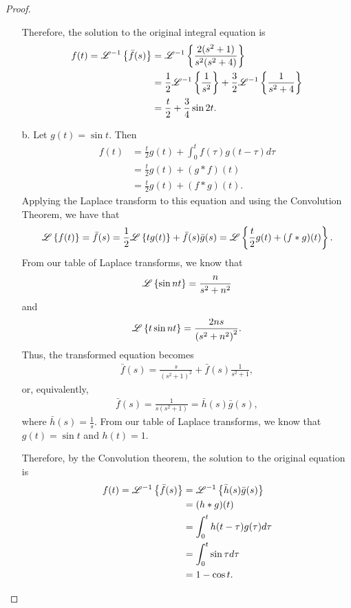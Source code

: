 \begin{proof}
\begin{enumerate}
      Therefore, the solution to the original integral equation is
      \begin{align*}
        f(t) = \mathscr{L}^{-1}\left\{ {\bar{f}(s)} \right\}
        &= \mathscr{L}^{-1}\left\{ {\frac{2(s^2 + 1)}{s^2(s^2+4)}} \right\}\\
        &= \frac{1}{2}\mathscr{L}^{-1}\left\{ {\frac{1}{s^2}} \right\} + \frac{3}{2}\mathscr{L}^{-1}\left\{ {\frac{1}{s^2+4}} \right\}\\
        &= \frac{t}{2} + \frac{3}{4} \sin 2t.
      \end{align*}

    \item[b.] Let $g(t) = \sin t$. Then
      \begin{align*}
        f(t) &= \frac{t}{2}g(t) + \int_0^t f(\tau)g(t-\tau) d\tau \\
        &= \frac{t}{2}g(t) + (g \ast f)(t) \\
        &= \frac{t}{2}g(t) + (f \ast g)(t).
      \end{align*}
      Applying the Laplace transform to this equation and using the Convolution Theorem, we have that
      \begin{align*}
        \mathscr{L}\left\{ {f(t)} \right\} = \bar{f}(s) = \frac{1}{2}\mathscr{L}\left\{ {t g(t)} \right\} + \bar{f}(s)\bar{g}(s) = \mathscr{L}\left\{ {\frac{t}{2}g(t) + (f \ast g)(t)} \right\}.
      \end{align*}
      From our table of Laplace transforms, we know that
      \begin{align*}
        \mathscr{L}\left\{ {\sin n t} \right\} = \frac{n}{s^2 + n^2}
      \end{align*}
      and
      \begin{align*}
        \mathscr{L}\left\{ {t \sin n t} \right\} = \frac{2ns}{\left(s^2 + n^2\right)^2}.
      \end{align*}
      Thus, the transformed equation becomes
      \begin{align*}
        \bar{f}(s) = \frac{s}{\left(s^2 + 1\right)^2} + \bar{f}(s)\frac{1}{s^2 + 1},
      \end{align*}
      or, equivalently,
      \begin{align*}
        \bar{f}(s) = \frac{1}{s(s^2+1)} = \bar{h}(s)\bar{g}(s),
      \end{align*}
      where $\bar{h}(s) = \frac{1}{s}$. From our table of Laplace transforms, we know that
      $g(t) = \sin t$ and $h(t) = 1$.

      Therefore, by the Convolution theorem, the solution to the original equation is
      \begin{align*}
        f(t) = \mathscr{L}^{-1}\left\{ {\bar{f}(s)} \right\} &= \mathscr{L}^{-1}\left\{ {\bar{h}(s)\bar{g}(s)} \right\} \\
        &= (h \ast g)(t) \\
        &= \int_0^t h(t- \tau) g(\tau) d\tau \\
        &= \int_0^t \sin \tau d\tau \\
        &= 1 - \cos t.
      \end{align*}


\end{enumerate}
\end{proof}
